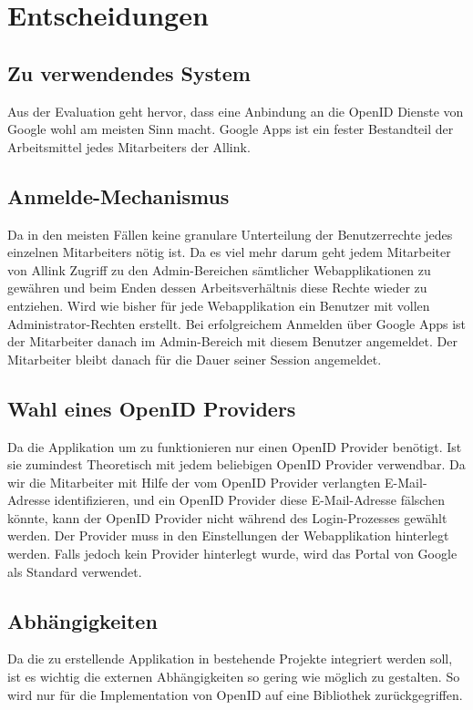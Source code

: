 \section{Entscheidungen}
\label{sec:Entscheidungen}

\subsection{Zu verwendendes System}
\label{sub:Zu verwendendes System}
Aus der Evaluation geht hervor, dass eine Anbindung an die OpenID Dienste von Google wohl am meisten Sinn macht. Google Apps ist ein fester Bestandteil der Arbeitsmittel jedes Mitarbeiters der Allink.

\subsection{Anmelde-Mechanismus}
\label{sub:Anmelde-Mechanismus}
Da in den meisten Fällen keine granulare Unterteilung der Benutzerrechte jedes einzelnen Mitarbeiters nötig ist. Da es viel mehr darum geht jedem Mitarbeiter von Allink Zugriff zu den Admin-Bereichen sämtlicher Webapplikationen zu gewähren und beim Enden dessen Arbeitsverhältnis diese Rechte wieder zu entziehen. Wird wie bisher für jede Webapplikation ein Benutzer mit vollen Administrator-Rechten erstellt. Bei erfolgreichem Anmelden über Google Apps ist der Mitarbeiter danach im Admin-Bereich mit diesem Benutzer angemeldet. Der Mitarbeiter bleibt danach für die Dauer seiner Session angemeldet.

\subsection{Wahl eines OpenID Providers}
\label{sub:Wahl eines OpenID Providers}
Da die Applikation um zu funktionieren nur einen OpenID Provider benötigt. Ist sie zumindest Theoretisch mit jedem beliebigen OpenID Provider verwendbar. Da wir die Mitarbeiter mit Hilfe der vom OpenID Provider verlangten E-Mail-Adresse identifizieren, und ein OpenID Provider diese E-Mail-Adresse fälschen könnte, kann der OpenID Provider nicht während des Login-Prozesses gewählt werden. Der Provider muss in den Einstellungen der Webapplikation hinterlegt werden. Falls jedoch kein Provider hinterlegt wurde, wird das Portal von Google als Standard verwendet.

\subsection{Abhängigkeiten}
\label{sub:Abhängigkeiten}
Da die zu erstellende Applikation in bestehende Projekte integriert werden soll, ist es wichtig die externen Abhängigkeiten so gering wie möglich zu gestalten. So wird nur für die Implementation von OpenID auf eine Bibliothek zurückgegriffen.

